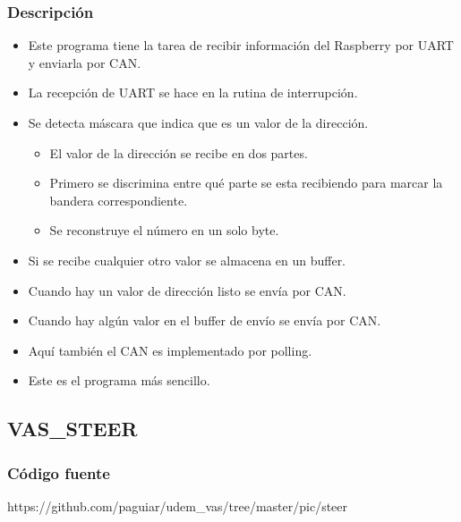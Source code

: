 \subsubsection{Descripción}
\begin{itemize}
\item Este programa tiene la tarea de recibir información del Raspberry por UART y enviarla por CAN.
\item La recepción de UART se hace en la rutina de interrupción.
\item Se detecta máscara que indica que es un valor de la dirección.
 \begin{itemize}
  \item El valor de la dirección se recibe en dos partes.
  \item Primero se discrimina entre qué parte se esta recibiendo para marcar la bandera correspondiente.
  \item Se reconstruye el número en un solo byte.
 \end{itemize}
\item Si se recibe cualquier otro valor se almacena en un buffer.
\item Cuando hay un valor de dirección listo se envía por CAN.
\item Cuando hay algún valor en el buffer de envío se envía por CAN.
\item Aquí también el CAN es implementado por polling.
\item Este es el programa más sencillo.
\end{itemize}

\subsection{VAS\_STEER}
\subsubsection{Código fuente}
https://github.com/paguiar/udem\_vas/tree/master/pic/steer 
